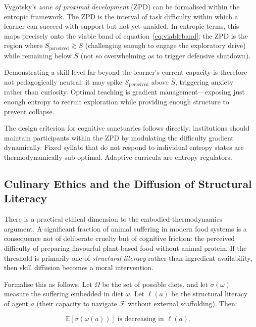 \documentclass[12pt,a4paper]{article}
\theoremstyle{definition}
\begin{document}
Vygotsky's \emph{zone of proximal development} (ZPD) can be formalised
within the entropic framework.  The ZPD is the interval of task difficulty
within which a learner can succeed with support but not yet unaided.  In
entropic terms, this maps precisely onto the viable band of
equation~\eqref{eq:viableband}: the ZPD is the region where
$S_{\mathrm{perceived}} \gtrsim \underline{S}$ (challenging enough to engage
the exploratory drive) while remaining below $\overline{S}$ (not so
overwhelming as to trigger defensive shutdown).

Demonstrating a skill level far beyond the learner's current capacity is
therefore not pedagogically neutral: it may spike $S_{\mathrm{perceived}}$
above $\overline{S}$, triggering anxiety rather than curiosity.  Optimal
teaching is gradient management---exposing just enough entropy to recruit
exploration while providing enough structure to prevent collapse.

\begin{tcolorbox}[policybox]
  The design criterion for cognitive sanctuaries follows directly: institutions
  should maintain participants within the ZPD by modulating the difficulty
  gradient dynamically.  Fixed syllabi that do not respond to individual
  entropy states are thermodynamically sub-optimal.  Adaptive curricula are
  entropy regulators.
\end{tcolorbox}

\subsection{Culinary Ethics and the Diffusion of Structural Literacy}

There is a practical ethical dimension to the embodied-thermodynamics
argument.  A significant fraction of animal suffering in modern food systems
is a consequence not of deliberate cruelty but of cognitive friction: the
perceived difficulty of preparing flavourful plant-based food without animal
protein.  If the threshold is primarily one of \emph{structural literacy}
rather than ingredient availability, then skill diffusion becomes a moral
intervention.

Formalise this as follows.  Let $\Omega$ be the set of possible diets,
and let $\sigma(\omega)$ measure the suffering embedded in diet $\omega$.
Let $\ell(a)$ be the structural literacy of agent $a$ (their capacity to
navigate $\mathcal{F}$ without external scaffolding).  Then:

\begin{equation}
  \mathbb{E}[\sigma(\omega(a))] \text{ is decreasing in } \ell(a),
\end{equation}
\end{document}
